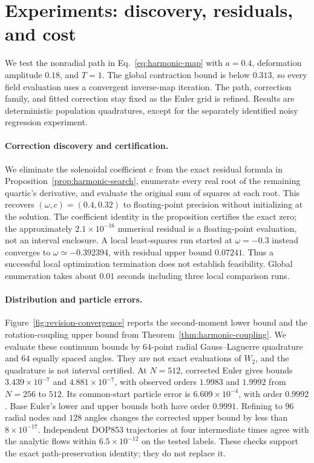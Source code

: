 \section{Experiments: discovery, residuals, and cost}
\label{sec:revision-experiments}

We test the nonradial path in Eq.~\eqref{eq:harmonic-map} with $a=0.4$, deformation amplitude $0.18$, and $T=1$. The global contraction bound is below $0.313$, so every field evaluation uses a convergent inverse-map iteration. The path, correction family, and fitted correction stay fixed as the Euler grid is refined. Results are deterministic population quadratures, except for the separately identified noisy regression experiment.

\paragraph{Correction discovery and certification.}
We eliminate the solenoidal coefficient $c$ from the exact residual formula in Proposition~\ref{prop:harmonic-search}, enumerate every real root of the remaining quartic's derivative, and evaluate the original sum of squares at each root. This recovers $(\omega,c)=(0.4,0.32)$ to floating-point precision without initializing at the solution. The coefficient identity in the proposition certifies the exact zero; the approximately $2.1\times10^{-16}$ numerical residual is a floating-point evaluation, not an interval enclosure. A local least-squares run started at $\omega=-0.3$ instead converges to $\omega\simeq-0.392394$, with residual upper bound $0.07241$. Thus a successful local optimization termination does not establish feasibility. Global enumeration takes about $0.01$ seconds including three local comparison runs.

\paragraph{Distribution and particle errors.}
Figure~\ref{fig:revision-convergence} reports the second-moment lower bound and the rotation-coupling upper bound from Theorem~\ref{thm:harmonic-coupling}. We evaluate these continuum bounds by $64$-point radial Gauss--Laguerre quadrature and $64$ equally spaced angles. They are not exact evaluations of $W_2$, and the quadrature is not interval certified. At $N=512$, corrected Euler gives bounds $3.439\times10^{-7}$ and $4.881\times10^{-7}$, with observed orders $1.9983$ and $1.9992$ from $N=256$ to $512$. Its common-start particle error is $6.609\times10^{-4}$, with order $0.9992$. Base Euler's lower and upper bounds both have order $0.9991$. Refining to $96$ radial nodes and $128$ angles changes the corrected upper bound by less than $8\times10^{-17}$. Independent DOP853 trajectories at four intermediate times agree with the analytic flows within $6.5\times10^{-12}$ on the tested labels. These checks support the exact path-preservation identity; they do not replace it.

